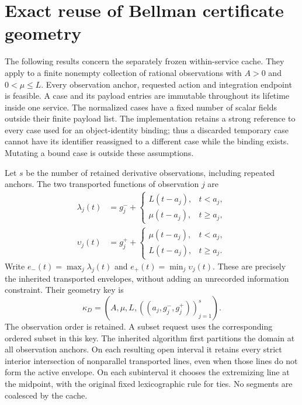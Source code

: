 \section{Exact reuse of Bellman certificate geometry}
\label{supp:cachedgeometry126c}

The following results concern the separately frozen within-service cache.
They apply to a finite nonempty collection of rational observations with
$A>0$ and $0<\mu\le L$.  Every observation anchor, requested action and integration endpoint
is feasible.  A case and its payload entries are immutable throughout its
lifetime inside one service.  The normalized cases have a fixed number of scalar fields outside their
finite payload list.  The implementation retains a strong reference
to every case used for an object-identity binding; thus a discarded temporary
case cannot have its identifier reassigned to a different case while the
binding exists.  Mutating a bound case is outside these assumptions.

Let $s$ be the number of retained derivative observations, including repeated
anchors.  The two transported functions of observation $j$ are
\begin{align*}
 \lambda_j(t)&=g_j^-+
  \begin{cases}L(t-a_j),&t<a_j,\\\mu(t-a_j),&t\ge a_j,\end{cases}\\
 \upsilon_j(t)&=g_j^++
  \begin{cases}\mu(t-a_j),&t<a_j,\\L(t-a_j),&t\ge a_j.\end{cases}
\end{align*}
Write $e_-(t)=\max_j\lambda_j(t)$ and
$e_+(t)=\min_j\upsilon_j(t)$.  These are precisely the inherited
transported envelopes, without adding an unrecorded information constraint.
Their geometry key is
\[
 \kappa_D=(A,\mu,L,((a_j,g_j^-,g_j^+))_{j=1}^s).
\]
The observation order is retained.  A subset request uses the corresponding
ordered subset in this key.  The inherited algorithm first partitions the
domain at all observation anchors.  On each resulting open interval it
retains every strict interior intersection of nonparallel transported lines,
even when those lines do not form the active envelope.  On each subinterval
it chooses the extremizing line at the midpoint, with the original fixed
lexicographic rule for ties.  No segments are coalesced by the cache.

